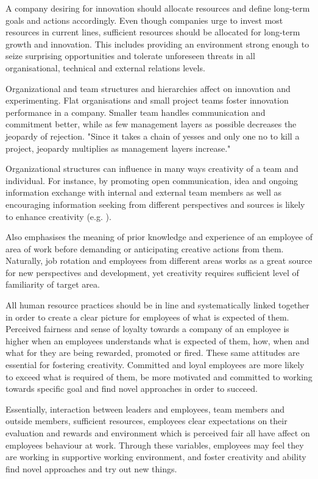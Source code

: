A company desiring for innovation should allocate resources and define long-term goals and actions accordingly. Even though companies urge to invest most resources in current lines, sufficient resources should be allocated for long-term growth and innovation. This includes providing an environment strong enough to seize surprising opportunities and tolerate unforeseen threats in all organisational, technical and external relations levels. \citep{quinn1985managing} 

Organizational and team structures and hierarchies affect on innovation and experimenting. Flat organisations and small project teams foster innovation performance in a company. Smaller team handles communication and commitment better, while as few management layers as possible decreases the jeopardy of rejection. "Since it takes a chain of yesses and only one no to kill a project, jeopardy multiplies as management layers increase."\citep{quinn1985managing}

Organizational structures can influence in many ways creativity of a team and individual. For instance, by promoting open communication, idea and ongoing information exchange with internal and external team members as well as encouraging information seeking from different perspectives and sources is likely to enhance creativity (e.g. \citep{ancona1992demography,dougherty1996sustained}). 

Also \citet{shalley2004leaders} emphasises the meaning of prior knowledge and experience of an employee of area of work before demanding or anticipating creative actions from them. Naturally, job rotation and employees from different areas works as a great source for new perspectives and development, yet creativity requires sufficient level of familiarity of target area. \citep{shalley2004leaders}

All human resource practices should be in line and systematically linked together in order to create a clear picture for employees of what is expected of them. Perceived fairness and sense of loyalty towards a company of an employee is higher when an employees understands what is expected of them, how, when and what for they are being rewarded, promoted or fired. These same attitudes are essential for fostering creativity. Committed and loyal employees are more likely to exceed what is required of them, be more motivated and committed to working towards specific goal and find novel approaches in order to succeed. \citep{shalley2004leaders}

Essentially, interaction between leaders and employees, team members and outside members, sufficient resources, employees clear expectations on their evaluation and rewards and environment which is perceived fair all have affect on employees behaviour at work. Through these variables, employees may feel they are working in supportive working environment, and foster creativity and ability find novel approaches and try out new things. \citep{shalley2004leaders}

